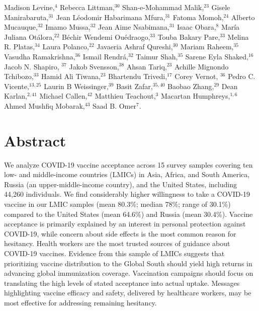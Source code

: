 \documentclass[
  12pt,
]{article}
\begin{document}
Madison Levine,\(^{4}\) Rebecca Littman,\(^{30}\) Shan-e-Mohammad Malik,\(^{23}\) Gisele Manirabaruta,\(^{31}\) Jean Léodomir Habarimana Mfura,\(^{31}\) Fatoma Momoh,\(^{24}\) Alberto Mucauque,\(^{32}\) Imamo Mussa,\(^{32}\) Jean Aime Nsabimana,\(^{31}\) Isaac Obara,\(^{8}\) María Juliana Otálora,\(^{22}\) Béchir Wendemi Ouédraogo,\(^{33}\) Touba Bakary Pare,\(^{33}\) Melina R. Platas,\(^{34}\) Laura Polanco,\(^{22}\) Javaeria Ashraf Qureshi,\(^{30}\) Mariam Raheem,\(^{35}\) Vasudha Ramakrishna,\(^{36}\) Ismail Rendrá,\(^{32}\) Taimur Shah,\(^{35}\) Sarene Eyla Shaked,\(^{16}\) Jacob N. Shapiro, \(^{37}\) Jakob Svensson,\(^{38}\) Ahsan Tariq,\(^{23}\) Achille Mignondo Tchibozo,\(^{33}\) Hamid Ali Tiwana,\(^{23}\) Bhartendu Trivedi,\(^{17}\) Corey Vernot, \(^{36}\) Pedro C. Vicente,\(^{13, 25}\) Laurin B Weissinger,\(^{39}\) Basit Zafar,\(^{35, 40}\) Baobao Zhang,\(^{29}\) Dean Karlan,\(^{2, 41}\) Michael Callen,\(^{42}\) Matthieu Teachout,\(^{3}\) Macartan Humphreys,\(^{1, 6}\) Ahmed Mushfiq Mobarak,\(^{43}\) Saad B. Omer\(^{7}\).

\newpage

\hypertarget{abstract}{%
\section*{Abstract}\label{abstract}}

We analyze COVID-19 vaccine acceptance across 15 survey samples covering ten low- and middle-income countries (LMICs) in Asia, Africa, and South America, Russia (an upper-middle-income country), and the United States, including 44,260 individuals. We find considerably higher willingness to take a COVID-19 vaccine in our LMIC samples (mean 80.3\%; median 78\%; range of 30.1\%) compared to the United States (mean 64.6\%) and Russia (mean 30.4\%). Vaccine acceptance is primarily explained by an interest in personal protection against COVID-19, while concern about side effects is the most common reason for hesitancy. Health workers are the most trusted sources of guidance about COVID-19 vaccines. Evidence from this sample of LMICs suggests that prioritizing vaccine distribution to the Global South should yield high returns in advancing global immunization coverage. Vaccination campaigns should focus on translating the high levels of stated acceptance into actual uptake. Messages highlighting vaccine efficacy and safety, delivered by healthcare workers, may be most effective for addressing remaining hesitancy.
\end{document}
